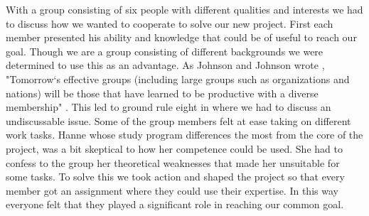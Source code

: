 With a group consisting of six people with different qualities and interests we had to discuss how we wanted to cooperate to solve our new project. First each member presented his ability and knowledge that could be of useful to reach our goal. Though we are a group consisting of different backgrounds we were determined to use this as an advantage. As Johnson and Johnson wrote \cite{ValuingDiversity}, "Tomorrow`s effective groups (including large groups such as organizations and nations) will be those that have learned to be productive with a diverse membership" . This led to ground rule eight in \cite{EffectiveGroups} where we had to discuss an undiscussable issue. Some of the group members felt at ease taking on different work tasks. Hanne whose study program differences the most from the core of the project, was a bit skeptical to how her competence could be used. She had to confess to the group her theoretical weaknesses that made her unsuitable for some tasks. To solve this we took action and shaped the project so that every member got an assignment where they could use their expertise. In this way everyone felt that they played a significant role in reaching our common goal. 
